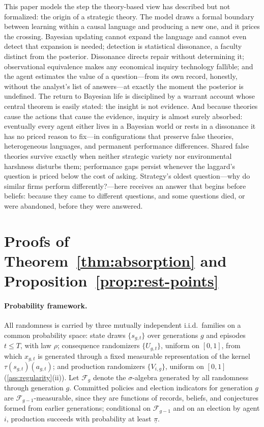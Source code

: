 \documentclass[11pt]{article}
\theoremstyle{definition}
\begin{document}
This paper models the step the theory-based view has described but not
formalized: the origin of a strategic theory.  The model draws a formal
boundary between learning within a causal language and producing a new one,
and it prices the crossing.  Bayesian updating cannot expand the language
and cannot even detect that expansion is needed; detection is statistical
dissonance, a faculty distinct from the posterior.  Dissonance directs
repair without determining it; observational equivalence makes any economical
inquiry technology fallible; and the agent estimates the value of a
question---from its own record, honestly, without the analyst's list of
answers---at exactly the moment the posterior is undefined.  The return to
Bayesian life is disciplined by a warrant account whose central theorem is
easily stated: the insight is not evidence.  And because theories cause the
actions that cause the evidence, inquiry is almost surely absorbed: eventually
every agent either lives in a Bayesian world or rests in a dissonance it has
no priced reason to fix---in configurations that preserve false theories,
heterogeneous languages, and permanent performance differences.  Shared false
theories survive exactly when neither strategic variety nor environmental
harshness disturbs them; performance gaps persist whenever the laggard's
question is priced below the cost of asking.  Strategy's oldest
question---why do similar firms perform differently?---here receives an answer
that begins before beliefs: because they came to different questions, and some
questions died, or were abandoned, before they were answered.




\appendix
\section{Proofs of Theorem~\ref{thm:absorption} and
Proposition~\ref{prop:rest-points}}
\label{app:absorption}

\paragraph{Probability framework.}
All randomness is carried by three mutually independent i.i.d.\ families on
a common probability space: state draws $\{s_{g,t}\}$ over generations $g$
and episodes $t\leq T$, with law $\rho$; consequence randomizers
$\{U_{g,t}\}$, uniform on $[0,1]$, from which $x_{g,t}$ is generated through
a fixed measurable representation of the kernel
$\tau(s_{g,t})(a_{g,t})$; and production randomizers $\{V_{i,g}\}$, uniform
on $[0,1]$ (\cref{ass:regularity}(ii)).  Let $\mathcal F_g$ denote the
$\sigma$-algebra generated by all randomness through generation $g$.
Committed policies and election indicators for generation $g$ are
$\mathcal F_{g-1}$-measurable, since they are functions of records, beliefs,
and conjectures formed from earlier generations; conditional on
$\mathcal F_{g-1}$ and on an election by agent $i$, production succeeds with
probability at least $\underline\pi$.
\end{document}
